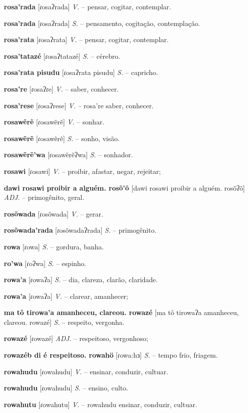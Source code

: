 \textbf{rosa'rada} [ɾosaʔrada] \textit{V.} -- pensar, cogitar, contemplar.

\textbf{rosa'rada} [ɾosaʔrada] \textit{S.} -- pensamento, cogitação, contemplação.

\textbf{rosa'rata} [ɾosaʔrata] \textit{V.} -- pensar, cogitar, contemplar.

\textbf{rosa'tatazé} [ɾosaʔtatazé] \textit{S.} -- cérebro.

\textbf{rosa'rata pisudu} [ɾosaʔrata pisudu] \textit{S.} -- capricho.

\textbf{rosa're} [ɾosaʔɾe] \textit{V.} -- saber, conhecer.

\textbf{rosa'rese} [ɾosaʔrese] \textit{V.} -- rosa're saber, conhecer.

\textbf{rosawẽrẽ} [ɾosawẽrẽ] \textit{V.} -- sonhar.

\textbf{rosawẽrẽ} [ɾosawẽrẽ] \textit{S.} -- sonho, visão.

\textbf{rosawẽrẽ'wa} [ɾosawẽrẽʔwa] \textit{S.} -- sonhador.

\textbf{rosawi} [ɾosawi] \textit{V.} -- proibir, afastar, negar, rejeitar;

\textbf{dawi rosawi proibir a alguém. rosõ'õ} [dawi rosawi proibir a alguém. rosõʔõ] \textit{ADJ.} -- primogênito, geral.

\textbf{rosõwada} [ɾosõwada] \textit{V.} -- gerar.

\textbf{rosõwada'rada} [ɾosõwadaʔrada] \textit{S.} -- primogênito.

\textbf{rowa} [ɾowa] \textit{S.} -- gordura, banha.

\textbf{ro'wa} [ɾoʔwa] \textit{S.} -- espinho.

\textbf{rowa'a} [ɾowaʔa] \textit{S.} -- dia, clareza, clarão, claridade.

\textbf{rowa'a} [ɾowaʔa] \textit{V.} -- clarear, amanhecer;

\textbf{ma tô tirowa'a amanheceu, clareou. rowazé} [ma tô tirowaʔa amanheceu, clareou. rowazé] \textit{S.} -- respeito, vergonha.

\textbf{rowazé} [ɾowazé] \textit{ADJ.} -- respeitoso, vergonhoso;

\textbf{rowazéb di é respeitoso. rowahö} [ɾowa:hɜ] \textit{S.} -- tempo frio, friagem.

\textbf{rowahudu} [ɾowahudu] \textit{V.} -- ensinar, conduzir, cultuar.

\textbf{rowahudu} [ɾowahudu] \textit{S.} -- ensino, culto.

\textbf{rowahutu} [ɾowahutu] \textit{V.} -- rowahudu ensinar, conduzir, cultuar.

